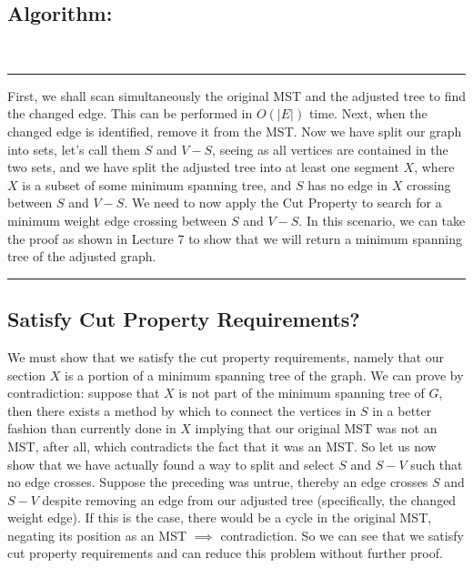 \documentclass[conference]{styles/acmsiggraph}
\newcommand{\?}{\stackrel{?}{=}}
\begin{document}
\subsection{Algorithm:} \\
\rule{\textwidth}{0.4pt}
First, we shall scan simultaneously the original MST and the adjusted tree to find the changed edge.  This can be performed in $O(|E|)$ time.  Next, when the changed edge is identified, remove it from the MST.  Now we have split our graph into sets, let's call them $S$ and $V-S$, seeing as all vertices are contained in the two sets, and we have split the adjusted tree into at least one segment $X$, where $X$ is a subset of some minimum spanning tree, and $S$ has no edge in $X$ crossing between $S$ and $V-S$.  We need to now apply the Cut Property to search for a minimum weight edge crossing between $S$ and $V-S$.  In this scenario, we can take the proof as shown in Lecture 7 to show that we will return a minimum spanning tree of the adjusted graph.\\
\rule{\textwidth}{0.4pt}


\subsection{Satisfy Cut Property Requirements?}
We must show that we satisfy the cut property requirements, namely that our section $X$ is a portion of a minimum spanning tree of the graph.  We can prove by contradiction: suppose that $X$ is not part of the minimum spanning tree of $G$, then there exists a method by which to connect the vertices in $S$ in a better fashion than currently done in $X$ implying that our original MST was not an MST, after all, which contradicts the fact that it was an MST.  So let us now show that we have actually found a way to split and select $S$ and $S-V$ such that no edge crosses.  Suppose the preceding was untrue, thereby an edge crosses $S$ and $S-V$ despite removing an edge from our adjusted tree (specifically, the changed weight edge).  If this is the case, there would be a cycle in the original MST, negating its position as an MST $\implies$ contradiction.  So we can see that we satisfy cut property requirements and can reduce this problem without further proof.
\end{document}
